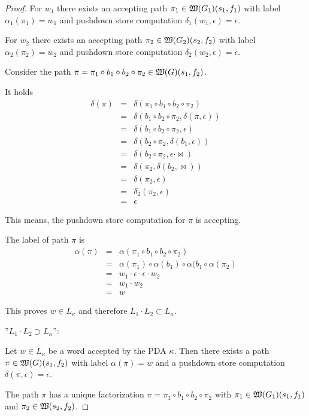 \begin{proof}
For $w_1$ there exists an accepting path $\pi_1 \in \mbox{$\mathfrak{W}({G_1})$}(s_1,
f_1)$ with label $\alpha_1(\pi_1) = w_1$ and pushdown store computation
$\delta_1(w_1, \epsilon) = \epsilon$.

For $w_2$ there exists an accepting path $\pi_2 \in \mbox{$\mathfrak{W}({G_2})$}(s_2,
f_2)$ with label $\alpha_2(\pi_2) = w_2$ and pushdown store computation
$\delta_2(w_2, \epsilon) = \epsilon$.

Consider the path $\pi = \pi_1 \circ b_1 \circ b_2 \circ \pi_2 \in
\mbox{$\mathfrak{W}({G})$}(s_1, f_2)$.

It holds
\begin{eqnarray*}
\delta(\pi) &=& \delta(\pi_1 \circ b_1 \circ b_2 \circ \pi_2) \\
&=& \delta(b_1 \circ b_2 \circ \pi_2, \delta(\pi, \epsilon)) \\
&=& \delta(b_1 \circ b_2 \circ \pi_2, \epsilon) \\
&=& \delta(b_2 \circ \pi_2, \delta(b_1, \epsilon)) \\
&=& \delta(b_2 \circ \pi_2, \epsilon \cdot \Join) \\
&=& \delta(\pi_2, \delta(b_2, \Join)) \\
&=& \delta(\pi_2, \epsilon) \\
&=& \delta_2(\pi_2, \epsilon) \\
&=& \epsilon
\end{eqnarray*}

This means, the pushdown store computation for $\pi$ is accepting.

The label of path $\pi$ is
\begin{eqnarray*}
\alpha(\pi) &=& \alpha(\pi_1 \circ b_1 \circ b_2 \circ \pi_2) \\
&=& \alpha(\pi_1) \circ \alpha(b_1) \circ \alpha(b_1 \circ \alpha(\pi_2) \\
&=& w_1 \cdot \epsilon \cdot \epsilon \cdot w_2 \\
&=& w_1 \cdot w_2 \\
&=& w
\end{eqnarray*}

This proves $w \in L_{\kappa}$ and therefore $L_1 \cdot L_2 \subset L_{\kappa}$.

''$L_1 \cdot L_2 \supset L_{\kappa}$'':

Let $w \in L_{\kappa}$ be a word accepted by the PDA $\kappa$. Then there exists
a path $\pi \in \mbox{$\mathfrak{W}({G})$}(s_1, f_2)$ with label $\alpha(\pi) = w$ and a
pushdown store computation $\delta(\pi, \epsilon) = \epsilon$.

The path $\pi$ has a unique factorization $\pi = \pi_1 \circ b_1 \circ b_2
\circ \pi_2$ with $\pi_1 \in \mbox{$\mathfrak{W}({G_1})$}(s_1, f_1)$ and $\pi_2 \in
\mbox{$\mathfrak{W}({s_2, f_2})$}$. 


\end{proof}

